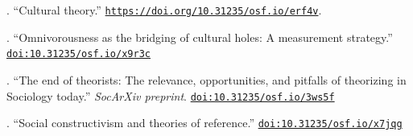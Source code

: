 . ``Cultural theory.'' \href{https://doi.org/10.31235/osf.io/erf4v}{\nolinkurl{https://doi.org/10.31235/osf.io/erf4v}}.

. ``Omnivorousness as the bridging of cultural holes: A measurement strategy.'' \href{https://doi.org/10.31235/osf.io/x9r3c}{\nolinkurl{doi:10.31235/osf.io/x9r3c}}

. ``The end of theorists: The relevance, opportunities, and pitfalls of theorizing in Sociology today.'' {\em SocArXiv preprint}. \href{https://doi.org/10.31235/osf.io/3ws5f}{\nolinkurl{doi:10.31235/osf.io/3ws5f}}

. ``Social constructivism and theories of reference.'' \href{https://doi.org/10.31235/osf.io/x7jqg}{\nolinkurl{doi:10.31235/osf.io/x7jqg}}


